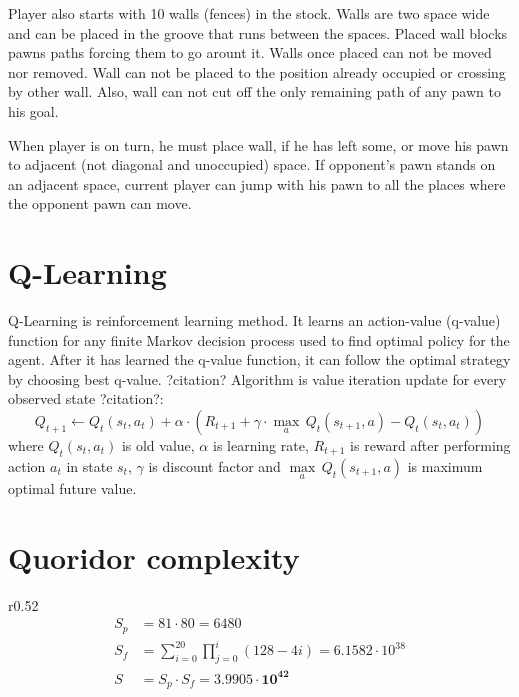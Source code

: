 Player also starts with 10 walls (fences) in the stock.
Walls are two space wide and can be placed in the groove that runs between
the spaces.
Placed wall blocks pawns paths forcing them to go arount it.
Walls once placed can not be moved nor removed.
Wall can not be placed to the position already occupied or crossing by
other wall.
Also, wall can not cut off the only remaining path of any pawn to his goal.

When player is on turn, he must place wall, if he has left some, or move
his pawn to adjacent (not diagonal and unoccupied) space.
If opponent's pawn stands on an adjacent space, current player can jump
with his pawn to all the places where the opponent pawn can move.

\section{Q-Learning}
  Q-Learning is reinforcement learning method. It learns an action-value
  (q-value) function for any finite Markov decision process used to find
  optimal policy for the agent. After it has learned the q-value function,
  it can follow the optimal strategy by choosing best q-value. ?citation?
  Algorithm is value iteration update for every observed state ?citation?:
  \begin{equation}
  Q_{t+1} \leftarrow Q_t(s_t, a_t) + \alpha \cdot (
      R_{t+1} + \gamma\cdot {\max_a}\,Q_t(s_{t+1}, a) - Q_t(s_t, a_t)
  )
  \end{equation}
  where $Q_t(s_t, a_t)$ is old value, $\alpha$ is learning rate, $R_{t+1}$ is
  reward after performing action $a_t$ in state $s_t$, $\gamma$ is discount
  factor and $\underset{a}{\max}\,Q_t(s_{t+1}, a)$ is maximum optimal future
  value.

\section{Quoridor complexity}
  \begin{wrapfigure}{r}{0.52\textwidth}
    \vspace*{-2.35cm}
    \begin{equation}
      \label{eqn:mertensestimate}
      \begin{aligned}
        S_p\!&=\!81 \cdot 80 = 6480 \\
        S_f\!&=\!\sum_{i=0}^{20}\prod_{j=0}^{i}(128 - 4i)\!=\!6.1582{\cdot}10^{38} \\
        S\!&=\!S_p \cdot S_f = \mathbf{3.9905 \cdot 10 ^{42}}
      \end{aligned}
    \end{equation}
    \vspace*{-1.25cm}
  \end{wrapfigure}

